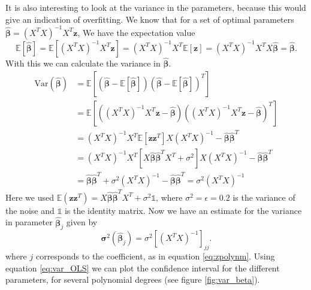 \documentclass[reprint,english,notitlepage,aps,nobalancelastpage,nofootinbib]{revtex4-1}  %
\newcommand{\vc}[1]{\mathbf{#1}}
\begin{document}
It is also interesting to look at the variance in the parameters, because this would give an indication of overfitting. We know that for a set of optimal parameters
$\boldsymbol{\hat{\beta}} = (X^TX)^{-1}X^T \vc{z}$,
We have the expectation value
\begin{equation*}
	\mathbb{E}[\boldsymbol{\hat{\beta}}] = \mathbb{E}[(X^TX)^{-1}X^T \vc{z}] = (X^TX)^{-1}X^T\mathbb{E}[\vc{z}] = (X^TX)^{-1}X^TX\boldsymbol{\hat{\beta}} = \boldsymbol{\hat{\beta}}.
\end{equation*}
With this we can calculate the variance in $\boldsymbol{\hat{\beta}}$.
\begin{align*}
	\text{Var}(\boldsymbol{\hat{\beta}}) &= \mathbb{E}\left[(\boldsymbol{\hat{\beta}} - \mathbb{E}[\boldsymbol{\hat{\beta}}])(\boldsymbol{\hat{\beta}} - \mathbb{E}[\boldsymbol{\hat{\beta}}])^T\right] \\
	&= \mathbb{E}\left[((X^TX)^{-1}X^T\vc{z}- \boldsymbol{\hat{\beta}})((X^TX)^{-1}X^T\vc{z}- \boldsymbol{\hat{\beta}})^T\right] \\
	&= (X^TX)^{-1}X^T \mathbb{E}\left[\vc{z}\vc{z}^T\right]X(X^TX)^{-1}- \boldsymbol{\hat{\beta}}\boldsymbol{\hat{\beta}}^T \\
	&= (X^TX)^{-1}X^T\left[X\boldsymbol{\hat{\beta}}\boldsymbol{\hat{\beta}}^TX^T + \sigma^2 \right] X (X^TX)^{-1} - \boldsymbol{\hat{\beta}}\boldsymbol{\hat{\beta}}^T \\
	&= \boldsymbol{\hat{\beta}}\boldsymbol{\hat{\beta}}^T + \sigma^2(X^TX)^{-1} - \boldsymbol{\hat{\beta}}\boldsymbol{\hat{\beta}}^T = \sigma^2(X^TX)^{-1}
\end{align*}
Here we used $\mathbb{E} (\vc{z}\vc{z}^T) = X \boldsymbol{\hat{\beta}}\boldsymbol{\hat{\beta}}^T X^T + \sigma^2\mathbb{1}$, where $\sigma^2 = \epsilon = 0.2$ is the variance of the noise and $\mathbb{1}$ is the identity matrix. Now we have an estimate for the variance in parameter $\boldsymbol{\hat{\beta}}_{j}$ given by
\begin{equation}
	\boldsymbol{\sigma}^2(\boldsymbol{\hat{\beta}}_{j}) = \sigma^2 [(X^TX)^{-1}]_{jj}.
	\label{eq:var_OLS}
\end{equation}
where $j$ corresponds to the coefficient, as in equation \eqref{eq:zpolynm}. Using equation \eqref{eq:var_OLS} we can plot the confidence interval for the different parameters, for several polynomial degrees (see figure \ref{fig:var_beta}).
\end{document}

